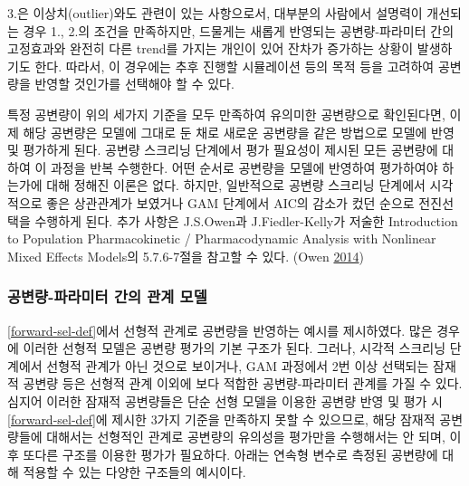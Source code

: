 \documentclass[
  11pt,
  krantz2, a4paper, twoside]{krantz}
\theoremstyle{definition}
\theoremstyle{definition}
\theoremstyle{definition}
\theoremstyle{remark}
\begin{document}
3.은 이상치(outlier)와도 관련이 있는 사항으로서, 대부분의 사람에서 설명력이 개선되는 경우 1., 2.의 조건을 만족하지만, 드물게는 새롭게 반영되는 공변량-파라미터 간의 고정효과와 완전히 다른 trend를 가지는 개인이 있어 잔차가 증가하는 상황이 발생하기도 한다. 따라서, 이 경우에는 추후 진행할 시뮬레이션 등의 목적 등을 고려하여 공변량을 반영할 것인가를 선택해야 할 수 있다.

특정 공변량이 위의 세가지 기준을 모두 만족하여 유의미한 공변량으로 확인된다면, 이제 해당 공변량은 모델에 그대로 둔 채로 새로운 공변량을 같은 방법으로 모델에 반영 및 평가하게 된다. 공변량 스크리닝 단계에서 평가 필요성이 제시된 모든 공변량에 대하여 이 과정을 반복 수행한다. 어떤 순서로 공변량을 모델에 반영하여 평가하여야 하는가에 대해 정해진 이론은 없다. 하지만, 일반적으로 공변량 스크리닝 단계에서 시각적으로 좋은 상관관계가 보였거나 GAM 단계에서 AIC의 감소가 컸던 순으로 전진선택을 수행하게 된다. 추가 사항은 J.S.Owen과 J.Fiedler-Kelly가 저술한 Introduction to Population Pharmacokinetic / Pharmacodynamic Analysis with Nonlinear Mixed Effects Models의 5.7.6-7절을 참고할 수 있다. (Owen \protect\hyperlink{ref-kelly}{2014})

\hypertarget{cov-param}{%
\subsubsection{공변량-파라미터 간의 관계 모델}\label{cov-param}}

\ref{forward-sel-def}에서 선형적 관계로 공변량을 반영하는 예시를 제시하였다. 많은 경우에 이러한 선형적 모델은 공변량 평가의 기본 구조가 된다. 그러나, 시각적 스크리닝 단계에서 선형적 관계가 아닌 것으로 보이거나, GAM 과정에서 2번 이상 선택되는 잠재적 공변량 등은 선형적 관계 이외에 보다 적합한 공변량-파라미터 관계를 가질 수 있다. 심지어 이러한 잠재적 공변량들은 단순 선형 모델을 이용한 공변량 반영 및 평가 시 \ref{forward-sel-def}에 제시한 3가지 기준을 만족하지 못할 수 있으므로, 해당 잠재적 공변량들에 대해서는 선형적인 관계로 공변량의 유의성을 평가만을 수행해서는 안 되며, 이후 또다른 구조를 이용한 평가가 필요하다. 아래는 연속형 변수로 측정된 공변량에 대해 적용할 수 있는 다양한 구조들의 예시이다.
\end{document}

